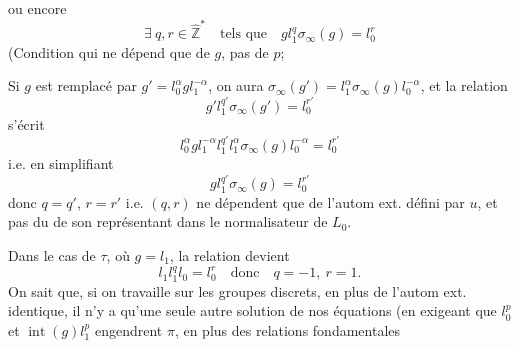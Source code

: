 ou encore
\[
\exists\ q,r\in\hat{\mathbb Z}^{*}\quad\text{tels que}\quad\boxed{gl_1^q\sigma_\infty(g)=l_0^r}
\]
(Condition qui ne dépend que de $g$, pas de $p$;

Si $g$ est remplacé par $g'=l_0^\alpha gl_1^{-\alpha}$, on aura $\sigma_\infty(g')=l_1^\alpha\sigma_\infty(g)l_0^{-\alpha}$, et la relation
\[
g'l_1^{q'}\sigma_\infty(g')=l_0^{r'}
\]
s'écrit
\[
l_0^\alpha gl_1^{-\alpha}l_1^{q'}l_1^\alpha\sigma_\infty(g)l_0^{-\alpha}=l_0^{r'}
\]
i.e. en simplifiant
\[
gl_1^{q'}\sigma_\infty(g)=l_0^{r'}
\]
donc $q=q'$, $r=r'$ i.e. $(q,r)$ ne dépendent que de l'autom ext. défini par $u$, et pas du  de son représentant dans le normalisateur de $L_0$.

Dans le cas de $\tau$, où $g=l_1$, la relation devient
\[
l_1l_1^ql_0=l_0^r\quad\text{donc}\quad q=-1,\ r=1.
\]
On sait que, si on travaille sur les groupes discrets, en plus de l'autom ext. identique, il n'y a qu'une seule autre solution de nos équations (en exigeant  que $l_0^p$ et $\operatorname{int}(g)l_1^p$ engendrent $\pi$, en plus des relations fondamentales
